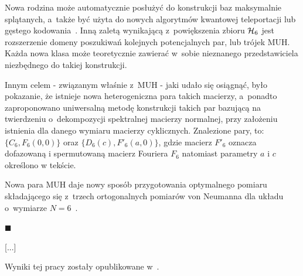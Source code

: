 \documentclass[a4paper,12pt,twoside]{article}
\newcommand{\HADAMARDS}[1]{{\cal H}_{#1}}
\begin{document}
Nowa rodzina mo\.{z}e automatycznie pos{\l}u\.{z}y\'{c} do konstrukcji baz maksymalnie spl\k{a}\-ta\-nych, a~tak\.{z}e by\'{c} u\.{z}yta do nowych algorytm\'{o}w kwantowej teleportacji lub g\k{e}stego kodowania~\cite{We01}. Inn\k{a} zalet\k{a} wynikaj\k{a}c\k{a} z~powi\k{e}kszenia zbioru $\HADAMARDS{6}$ jest rozszerzenie domeny poszukiwa\'{n} kolejnych potencjalnych par, lub tr\'{o}jek MUH. Ka\.{z}da nowa klasa mo\.{z}e teoretycznie zawiera\'{c} w~sobie nieznanego przedstawiciela niezb\k{e}dnego do takiej konstrukcji.

Innym celem - zwi\k{a}zanym w{\l}a\'{s}nie z~MUH - jaki uda{\l}o si\k{e} osi\k{a}gn\k{a}\'{c}, by{\l}o pokazanie, \.{z}e istnieje nowa heterogeniczna para takich macierzy, a~ponadto zaproponowano u\-ni\-wer\-sal\-n\k{a} metod\k{e} konstrukcji takich par bazuj\k{a}c\k{a} na twierdzeniu o~dekompozycji spektralnej macierzy normalnej, przy za{\l}o\.{z}eniu istnienia dla danego wymiaru macierzy cyklicznych. Znalezione pary, to:
$\{C_6, F_6(0, 0)\}$ oraz $\{D_6(c), F'_6(a, 0)\}$, gdzie macierz $F'_6$ oznacza dofazowan\k{a} i spermutowan\k{a} macierz Fouriera $F_6$ natomiast parametry $a$ i $c$ okre\'{s}lono w tek\'{s}cie.

Nowa para MUH daje nowy spos\'{o}b przygotowania optymalnego pomiaru sk{\l}adaj\k{a}cego si\k{e} z~trzech ortogonalnych pomiar\'{o}w von Neumanna dla uk{\l}adu o~wymiarze $N=6$~\cite{VAA87}.

\begin{flushright}
$\blacksquare$
\end{flushright}

[...]

Wyniki tej pracy zosta{\l}y opublikowane w~\cite{Be06}.

\end{document}
